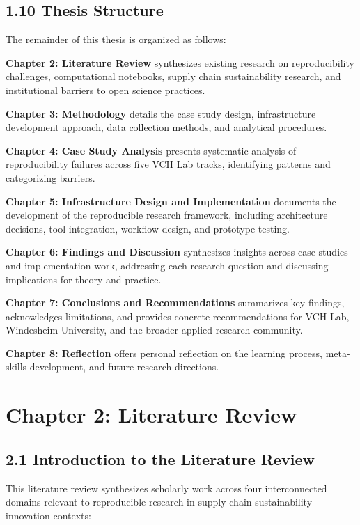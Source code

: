 \documentclass[
  oneside,
  open=any]{scrbook}
\begin{document}
\section{1.10 Thesis Structure}\label{thesis-structure}

The remainder of this thesis is organized as follows:

\textbf{Chapter 2: Literature Review} synthesizes existing research on
reproducibility challenges, computational notebooks, supply chain
sustainability research, and institutional barriers to open science
practices.

\textbf{Chapter 3: Methodology} details the case study design,
infrastructure development approach, data collection methods, and
analytical procedures.

\textbf{Chapter 4: Case Study Analysis} presents systematic analysis of
reproducibility failures across five VCH Lab tracks, identifying
patterns and categorizing barriers.

\textbf{Chapter 5: Infrastructure Design and Implementation} documents
the development of the reproducible research framework, including
architecture decisions, tool integration, workflow design, and prototype
testing.

\textbf{Chapter 6: Findings and Discussion} synthesizes insights across
case studies and implementation work, addressing each research question
and discussing implications for theory and practice.

\textbf{Chapter 7: Conclusions and Recommendations} summarizes key
findings, acknowledges limitations, and provides concrete
recommendations for VCH Lab, Windesheim University, and the broader
applied research community.

\textbf{Chapter 8: Reflection} offers personal reflection on the
learning process, meta-skills development, and future research
directions.

\chapter{Chapter 2: Literature
Review}\label{chapter-2-literature-review}

\section{2.1 Introduction to the Literature
Review}\label{introduction-to-the-literature-review}

This literature review synthesizes scholarly work across four
interconnected domains relevant to reproducible research in supply chain
sustainability innovation contexts:
\end{document}
